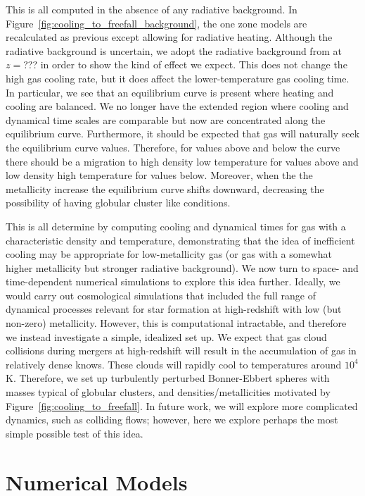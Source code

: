 \documentclass[useAMS,usenatbib]{mn2e}
\begin{document}
This is all computed in the absence of any radiative background.  In Figure~\ref{fig:cooling_to_freefall_background}, 
the one zone models are recalculated as previous except allowing for radiative heating.   Although the radiative background
is uncertain, we adopt the radiative background from \citet{Haardt2012} at $z=$??? 
in order to show the kind of effect we expect.  This does not change the high gas cooling rate, but it does affect the lower-temperature gas cooling time.   In particular, we see that an equilibrium curve is present where
heating and cooling are balanced. We no longer have the extended region where cooling and dynamical time scales are 
comparable but now are concentrated along the equilibrium curve. Furthermore, it should be expected that gas will
naturally seek the equilibrium curve values. Therefore, for values above and below the curve there should be a migration
to high density low temperature for values above and low density high temperature for values below.  Moreover, when the
the metallicity increase the equilibrium curve shifts downward, decreasing the possibility of having globular cluster
like conditions.

This is all determine by computing cooling and dynamical times for gas with a characteristic density and temperature, demonstrating that the idea of inefficient cooling may be appropriate for low-metallicity gas (or gas with a somewhat higher metallicity but stronger radiative background).   We now turn to space- and time-dependent numerical simulations to explore this idea further.  Ideally, we would carry out cosmological simulations that included the full range of dynamical processes relevant for star formation at high-redshift with low (but non-zero) metallicity.  However, this is computational intractable, and therefore we instead investigate a simple, idealized set up.  We expect that gas cloud collisions during mergers at high-redshift will result in the accumulation of gas in relatively dense knows.  These clouds will rapidly cool to temperatures around $10^4$ K.  Therefore, we set up turbulently perturbed Bonner-Ebbert spheres with masses typical of globular clusters, and densities/metallicities motivated by Figure~\ref{fig:cooling_to_freefall}.   In future work, we will explore more complicated dynamics, such as colliding flows; however, here we explore perhaps the most simple possible test of this idea.



%
\section{Numerical Models}
\label{sec:numerical}
\end{document}
